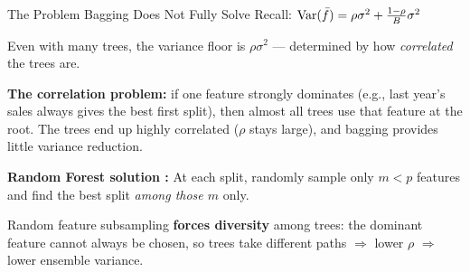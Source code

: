 \documentclass[aspectratio=169, 11pt]{beamer}
\begin{document}

\begin{frame}{The Problem Bagging Does Not Fully Solve}
  Recall: $\operatorname{Var}(\bar{f}) = \rho\sigma^2 + \tfrac{1-\rho}{B}\sigma^2$

  Even with many trees, the variance floor is $\rho\sigma^2$ ---
  determined by how \emph{correlated} the trees are.
  \begin{warningbox}
    \textbf{The correlation problem:} if one feature strongly dominates
    (e.g., last year's sales always gives the best first split),
    then almost all trees use that feature at the root.
    The trees end up highly correlated ($\rho$ stays large), and
    bagging provides little variance reduction.
  \end{warningbox}
  \textbf{Random Forest solution \parencite{Breiman2001}:}
  At each split, randomly sample only $m < p$ features
  and find the best split \emph{among those $m$} only.
  \begin{keybox}
    Random feature subsampling \textbf{forces diversity} among trees:
    the dominant feature cannot always be chosen,
    so trees take different paths $\Rightarrow$ lower $\rho$
    $\Rightarrow$ lower ensemble variance.
  \end{keybox}
\end{frame}
\end{document}
